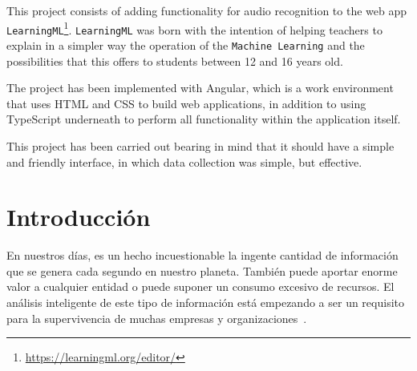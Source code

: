 \documentclass[a4paper, 12pt]{book}
\begin{document}
This project consists of adding functionality for audio recognition to the web app \texttt{LearningML}\footnote{\url{https://learningml.org/editor/}}. \texttt{LearningML} was born with the intention of helping teachers to explain in a simpler way the operation of the \texttt{Machine Learning} and the possibilities that this offers to students between 12 and 16 years old.

The project has been implemented with Angular, which is a work environment that uses HTML and CSS to build web applications, in addition to using TypeScript underneath to perform all functionality within the application itself.

This project has been carried out bearing in mind that it should have a simple and friendly interface, in which data collection was simple, but effective.




\tableofcontents 
\cleardoublepage
\listoffigures %



\cleardoublepage
\chapter{Introducción}
\label{chap:intro} %

En nuestros días, es un hecho incuestionable la ingente cantidad de información que se genera cada segundo en nuestro planeta. También puede aportar enorme valor a cualquier entidad o puede suponer un consumo excesivo de recursos. El análisis inteligente de este tipo de información está empezando a ser un requisito para la supervivencia de muchas empresas y organizaciones~\cite{mate2014big}.
\end{document}
